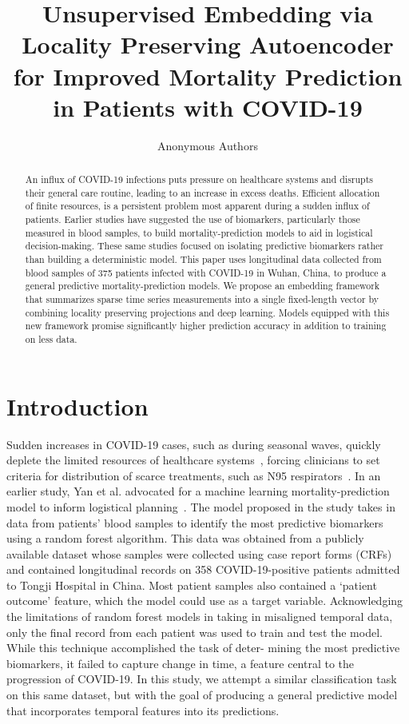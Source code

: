 \documentclass[letterpaper]{article} %
\title{Unsupervised Embedding via Locality Preserving Autoencoder for Improved Mortality Prediction in Patients with COVID-19}
\author{
    Anonymous Authors
}
\begin{document}
\maketitle

\begin{abstract} 
An influx of COVID-19 infections puts pressure on healthcare systems and
    disrupts their general care routine, leading to an increase in excess
    deaths. Efficient allocation of finite resources, is a persistent problem
    most apparent during a sudden influx of patients. Earlier studies have
    suggested the use of biomarkers, particularly those measured in blood
    samples, to build mortality-prediction models to aid in logistical
    decision-making. These same studies focused on isolating predictive
    biomarkers rather than building a deterministic model. This paper uses
    longitudinal data collected from blood samples of 375 patients infected
    with COVID-19 in Wuhan, China, to produce a general predictive
    mortality-prediction models. We propose an embedding framework that
    summarizes sparse time series measurements into a single fixed-length
    vector by combining locality preserving projections and deep learning.
    Models equipped with this new framework promise significantly higher
    prediction accuracy in addition to training on less data.
\end{abstract}

\section{Introduction}
Sudden increases in COVID-19 cases, such as during seasonal waves, quickly
deplete the limited resources of healthcare systems~\cite{kontis2020magnitude}, forcing clinicians to set
criteria for distribution of scarce treatments, such as N95
respirators~\cite{centers2020strategies}. In an earlier study, Yan et al. advocated for
a machine learning mortality-prediction model to inform logistical
planning~\cite{yan2020interpretable}.  The model proposed in the study takes in data from
patients' blood samples to identify the most predictive biomarkers using
a random forest algorithm. This data was obtained from a publicly available
dataset whose samples were collected using case report forms (CRFs) and
contained longitudinal records on 358 COVID-19-positive patients admitted to
Tongji Hospital in China. Most patient samples also contained a `patient
outcome' feature, which the model could use as a target variable. Acknowledging
the limitations of random forest models in taking in misaligned temporal data,
only the final record from each patient was used to train and test the model.
While this technique accomplished the task of deter- mining the most predictive
biomarkers, it failed to capture change in time, a feature central to the
progression of COVID-19. In this study, we attempt a similar classification
task on this same dataset, but with the goal of producing a general predictive
model that incorporates temporal features into its predictions.
\end{document}
